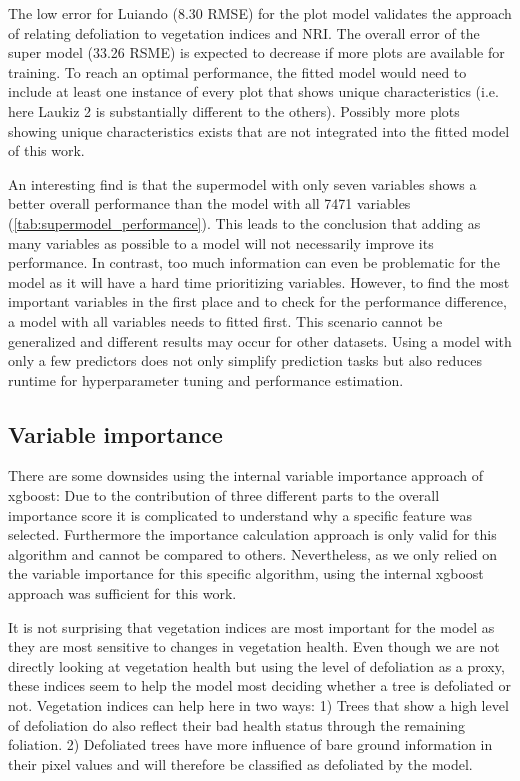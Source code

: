 \documentclass[review]{elsarticle}
\begin{document}
The low error for Luiando (8.30 RMSE) for the plot model validates the approach of relating defoliation to vegetation indices and NRI.
The overall error of the super model (33.26 RSME) is expected to decrease if more plots are available for training.
To reach an optimal performance, the fitted model would need to include at least one instance of every plot that shows unique characteristics (i.e. here Laukiz 2 is substantially different to the others).
Possibly more plots showing unique characteristics exists that are not integrated into the fitted model of this work.

An interesting find is that the supermodel with only seven variables shows a better overall performance than the model with all 7471 variables (\autoref{tab:supermodel_performance}).
This leads to the conclusion that adding as many variables as possible to a model will not necessarily improve its performance.
In contrast, too much information can even be problematic for the model as it will have a hard time prioritizing variables.
However, to find the most important variables in the first place and to check for the performance difference, a model with all variables needs to fitted first.
This scenario cannot be generalized and different results may occur for other datasets.
Using a model with only a few predictors does not only simplify prediction tasks but also reduces runtime for hyperparameter tuning and performance estimation.

\subsection{Variable importance}

There are some downsides using the internal variable importance approach of xgboost: Due to the contribution of three different parts to the overall importance score it is complicated to understand why a specific feature was selected.
Furthermore the importance calculation approach is only valid for this algorithm and cannot be compared to others.
Nevertheless, as we only relied on the variable importance for this specific algorithm, using the internal xgboost approach was sufficient for this work.

It is not surprising that vegetation indices are most important for the model as they are most sensitive to changes in vegetation health.
Even though we are not directly looking at vegetation health but using the level of defoliation as a proxy, these indices seem to help the model most deciding whether a tree is defoliated or not.
Vegetation indices can help here in two ways:
1) Trees that show a high level of defoliation do also reflect their bad health status through the remaining foliation.
2) Defoliated trees have more influence of bare ground information in their pixel values and will therefore be classified as defoliated by the model.
\end{document}
